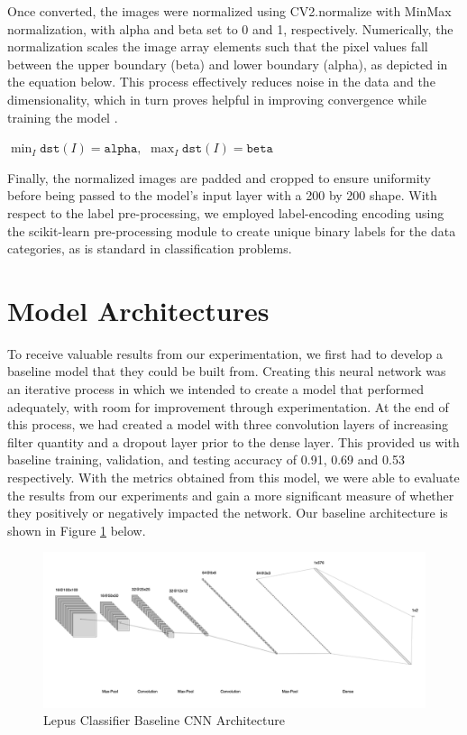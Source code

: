 \documentclass{article}
\begin{document}
Once converted, the images were normalized using CV2.normalize with MinMax normalization, with alpha and beta set to 0 and 1, respectively. Numerically, the normalization scales the image array elements such that the pixel values fall between the upper boundary (beta) and lower boundary (alpha), as depicted in the equation below. This process effectively reduces noise in the data and the dimensionality, which in turn proves helpful in improving convergence while training the model \cite{opencv_library}.
\newline
\newline
\centerline{$\min _I \texttt{dst} (I)= \texttt{alpha} , \, \, \max _I \texttt{dst} (I)= \texttt{beta}$ \cite{opencv_library}}

Finally, the normalized images are padded and cropped to ensure uniformity before being passed to the model's input layer with a 200 by 200 shape. With respect to the label pre-processing, we employed label-encoding encoding using the scikit-learn \cite{scikit-learn} pre-processing module to create unique binary labels for the data categories, as is standard in classification problems.

\section{Model Architectures}
To receive valuable results from our experimentation, we first had to develop a baseline model that they could be built from. Creating this neural network was an iterative process in which we intended to create a model that performed adequately, with room for improvement through experimentation. At the end of this process, we had created a model with three convolution layers of increasing filter quantity and a dropout layer prior to the dense layer. This provided us with baseline training, validation, and testing accuracy of 0.91, 0.69 and 0.53 respectively. With the metrics obtained from this model, we were able to evaluate the results from our experiments and gain a more significant measure of whether they positively or negatively impacted the network. Our baseline architecture is shown in Figure \ref{fig:CNN} below.
\newline
\begin{figure}[h!]
    \centering
    \includegraphics[scale=0.65]{CNN.png}
    \caption{Lepus Classifier Baseline CNN Architecture}
    \label{fig:CNN}
\end{figure}
\end{document}
